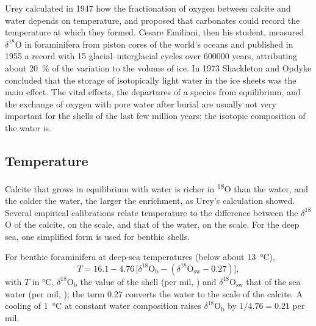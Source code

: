\begin{history}
Urey calculated in 1947 how the fractionation of oxygen between calcite and water depends on
temperature, and proposed that carbonates could record the temperature at which they formed. Cesare
Emiliani, then his student, measured $\delta^{18}$O in foraminifera from piston cores of the
world's oceans and published in 1955 a record with 15 glacial--interglacial cycles over
\num{600000} years, attributing about \qty{20}{\percent} of the variation to the volume of ice.
In 1973 Shackleton and Opdyke concluded that the storage of isotopically light water in the
ice sheets was the main effect. The vital effects, the departures of a species from equilibrium,
and the exchange of oxygen with pore water after burial are usually not very important for the
shells of the last few million years; the isotopic composition of the water is.
\end{history}

\subsection*{Temperature}

Calcite that grows in equilibrium with water is richer in \textsuperscript{18}O than the water,
and the colder the water, the larger the enrichment, as Urey's calculation showed. Several
empirical calibrations relate
temperature to the difference between the $\delta^{18}$O of the calcite, on the  scale, and
that of the water, on the  scale. For the deep sea, one simplified form is used for benthic
shells.

\begin{proposition}\label{prop:b2:climate-proxies:benthic}
For benthic foraminifera at deep-sea temperatures (below about \qty{13}{\celsius}),
\[
  T = 16.1 - 4.76\,\bigl[\delta^{18}\mathrm{O}_{\mathrm{b}} - (\delta^{18}\mathrm{O}_{\mathrm{sw}} -
  0.27)\bigr],
\]
with $T$ in \unit{\celsius}, $\delta^{18}\mathrm{O}_{\mathrm{b}}$ the value of the shell (per mil,
) and $\delta^{18}\mathrm{O}_{\mathrm{sw}}$ that of the sea water (per mil, ); the term
0.27 converts the water to the scale of the calcite. A cooling of \qty{1}{\celsius} at constant
water composition raises $\delta^{18}\mathrm{O}_{\mathrm{b}}$ by $1/4.76 = 0.21$ per mil.
\end{proposition}
\admitted


